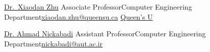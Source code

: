 
\newcommand{\refskip}{\enskip\cdotp\enskip}
\newcommand{\cesuffix}{{\refskip}Computer Engineering Department}

\begin{cvhonors}

  \cvref
    {\href{https://scholar.google.ca/citations?user=a6MYnuUAAAAJ&hl=en}{Dr.~Xiaodan Zhu}} %
    {Associate Professor\cesuffix\refskip\href{mailto:xiaodan.zhu@queensu.ca}{xiaodan.zhu@queensu.ca}} %
    {\href{https://www.queensu.ca/}{Queen's U}} %

  \cvref
    {\href{https://scholar.google.com/citations?user=pSMNSZwAAAAJ&hl=en}{Dr. Ahmad Nickabadi}} %
    {Assistant Professor\cesuffix\refskip\href{mailto:nickabadi@aut.ac.ir}{nickabadi@aut.ac.ir}} %
    {} %





\end{cvhonors}
